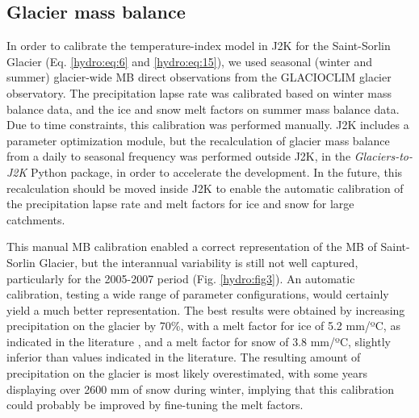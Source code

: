 \subsection{Glacier mass balance}

In order to calibrate the temperature-index model in J2K for the Saint-Sorlin Glacier (Eq. \ref{hydro:eq:6} and \ref{hydro:eq:15}), we used seasonal (winter and summer) glacier-wide MB direct observations from the GLACIOCLIM glacier observatory. The precipitation lapse rate was calibrated based on winter mass balance data, and the ice and snow melt factors on summer mass balance data. Due to time constraints, this calibration was performed manually. J2K includes a parameter optimization module, but the recalculation of glacier mass balance from a daily to seasonal frequency was performed outside J2K, in the \textit{Glaciers-to-J2K} Python package, in order to accelerate the development. In the future, this recalculation should be moved inside J2K to enable the automatic calibration of the precipitation lapse rate and melt factors for ice and snow for large catchments.

This manual MB calibration enabled a correct representation of the MB of Saint-Sorlin Glacier, but the interannual variability is still not well captured, particularly for the 2005-2007 period (Fig. \ref{hydro:fig3}). An automatic calibration, testing a wide range of parameter configurations, would certainly yield a much better representation. The best results were obtained by increasing precipitation on the glacier by 70\%, with a melt factor for ice of 5.2 mm/ºC, as indicated in the literature \citep{reveillet_which_2017}, and a melt factor for snow of 3.8 mm/ºC, slightly inferior than values indicated in the literature. The resulting amount of precipitation on the glacier is most likely overestimated, with some years displaying over 2600 mm of snow during winter, implying that this calibration could probably be improved by fine-tuning the melt factors. 


